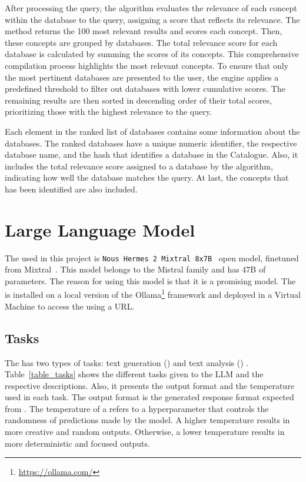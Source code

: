 After processing the query, the {\bm} algorithm evaluates the relevance of each concept within the database to the query, assigning a score that reflects its relevance. The method returns the 100 most relevant results and scores each concept. Then, these concepts are grouped by databases. The total relevance score for each database is calculated by summing the scores of its concepts. This comprehensive compilation process highlights the most relevant concepts. To ensure that only the most pertinent databases are presented to the user, the engine applies a predefined threshold to filter out databases with lower cumulative scores. The remaining results are then sorted in descending order of their total scores, prioritizing those with the highest relevance to the query.

Each element in the ranked list of databases contains some information about the databases. The ranked databases have a unique numeric identifier, the respective database name, and the hash that identifies a database in the {\ehden} Catalogue. Also, it includes the total relevance score assigned to a database by the {\bm} algorithm, indicating how well the database matches the query. At last, the concepts that has been identified are also included.



\section{Large Language Model}
\label{sec:llm}

The {\llm} used in this project is \texttt{Nous Hermes 2 Mixtral 8x7B}~\cite{Nous-Hermes-2-Mixtral-8x7B-DPO} open model, finetuned from Mixtral~\cite{jiang2024a}. This model belongs to the Mistral family and has 47B of parameters. The reason for using this {\llm} model is that it is a promising model. The {\llm} is installed on a local version of the Ollama\footnote{\url{https://ollama.com/}} framework and deployed in a Virtual Machine to access the {\llm} using a URL.


\subsection{Tasks}

The {\llm} has two types of tasks: text generation ({\nlg}) and text analysis ({\nlu}) . Table~\ref{table_tasks} shows the different tasks given to the LLM and the respective descriptions. Also, it presents the output format and the temperature used in each task. The output format is the generated response format expected from {\llm}. The temperature of a {\llm} refers to a hyperparameter that controls the randomness of predictions made by the model. A higher temperature results in more creative and random outputs. Otherwise, a lower temperature results in more deterministic and focused outputs.

